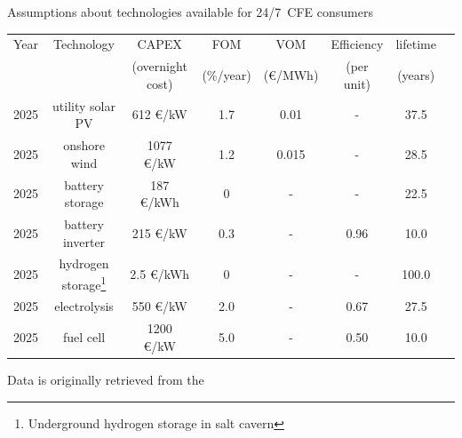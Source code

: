 \begin{frame}{Assumptions about technologies available for 24/7~CFE consumers}
  
  \centering
  {\footnotesize 

    \begin{tabular}{cccccccc}
      \hline
      \hline
      Year & Technology & CAPEX & FOM & VOM & Efficiency & lifetime \\
       &  & (overnight cost)  &  (\%/year) &  (€/MWh) & (per unit) & (years) \\
      \hline
      \hline
      2025 & utility solar PV & 612 €/kW & 1.7 & 0.01 & - & 37.5 \\
      \hline
      2025 & onshore wind & 1077 €/kW & 1.2 & 0.015 & - & 28.5 \\
      \hline
      2025 & battery storage & 187 €/kWh & 0 & - & - & 22.5 \\
      \hline
      2025  & battery inverter & 215 €/kW & 0.3 & - & 0.96  & 10.0 \\
      \hline
      2025 & hydrogen storage\footnote{{\scriptsize Underground hydrogen storage in salt cavern}} 
                  & 2.5 €/kWh & 0 & - & - & 100.0 \\
      \hline
      2025 & electrolysis & 550 €/kW & 2.0 & - & 0.67 & 27.5  \\
      \hline
      2025 & fuel cell & 1200 €/kW & 5.0 & - & 0.50 & 10.0 \\
      \hline
      \hline
      \end{tabular}
  
    Data is originally retrieved from the 
      \vspace{0.2cm}
  }
\end{frame}




